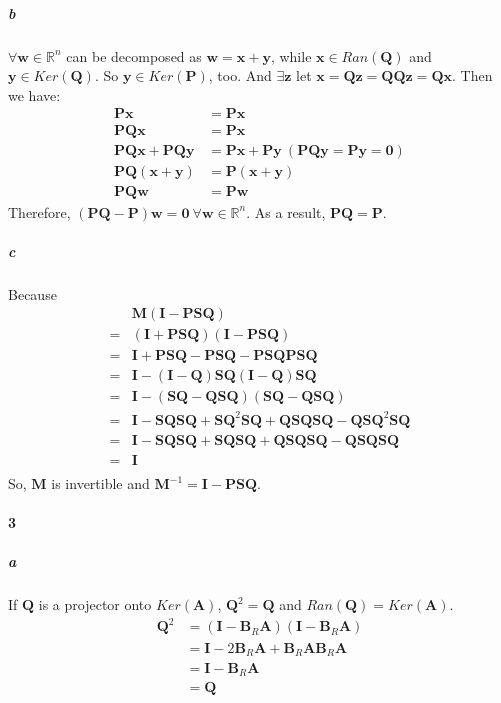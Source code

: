 \documentclass[22pt]{article}
\begin{document}
		\subparagraph{b}$\forall \mathbf{w} \in \mathbb{R}^{n}$ can be decomposed as $\mathbf{w} = \mathbf{x} + \mathbf{y}$, while $\mathbf{x} \in Ran(\mathbf{Q})$ and $\mathbf{y} \in Ker(\mathbf{Q})$. So $\mathbf{y} \in Ker(\mathbf{P})$, too. And $\exists \mathbf{z}$ let $\mathbf{x} = \mathbf{Qz} = \mathbf{QQz} = \mathbf{Qx}$. Then we have:
		\begin{align}
			\mathbf{Px} & = \mathbf{Px}\\
			\mathbf{PQx} & = \mathbf{Px} \\
			\mathbf{PQx} + \mathbf{PQy} & = \mathbf{Px} + \mathbf{Py} \ (\mathbf{PQy} = \mathbf{Py} = \mathbf{0})\\
			\mathbf{PQ(x+y)} & = \mathbf{P(x+y)}\\
			\mathbf{PQw} & = \mathbf{Pw}
		\end{align}
		Therefore, $(\mathbf{PQ}-\mathbf{P})\mathbf{w} = \mathbf{0}\  \forall \mathbf{w} \in \mathbb{R}^n$. As a result, $\mathbf{PQ} = \mathbf{P}$.


		\subparagraph{c}Because
		\begin{align}
		&\mathbf{M}(\mathbf{I}-\mathbf{PSQ})\\
		=&(\mathbf{I}+\mathbf{PSQ})(\mathbf{I}-\mathbf{PSQ})\\
		=&\mathbf{I} + \mathbf{PSQ} - \mathbf{PSQ} -\mathbf{PSQPSQ}\\
		=&\mathbf{I} - (\mathbf{I}-\mathbf{Q})\mathbf{SQ}(\mathbf{I}-\mathbf{Q})\mathbf{SQ}\\
		=&\mathbf{I} - (\mathbf{SQ} - \mathbf{QSQ})(\mathbf{SQ} - \mathbf{QSQ})\\
		=&\mathbf{I} - \mathbf{SQSQ} + \mathbf{SQ}^2\mathbf{SQ} +\mathbf{QSQSQ} - \mathbf{QSQ}^2\mathbf{SQ}\\
		=&\mathbf{I} - \mathbf{SQSQ} + \mathbf{SQSQ}+\mathbf{QSQSQ}- \mathbf{QSQSQ}\\
		=&\mathbf{I}\\
		\end{align}
		So, $\mathbf{M}$ is invertible and $\mathbf{M}^{-1}=\mathbf{I}-\mathbf{PSQ}$.

	\paragraph{3}
		\subparagraph{a} If $\mathbf{Q}$ is a projector onto $Ker(\mathbf{A})$, $\mathbf{Q}^2 = \mathbf{Q}$ and $Ran(\mathbf{Q}) = Ker(\mathbf{A})$.
		\begin{align}
			\mathbf{Q}^2 &= (\mathbf{I}-\mathbf{B}_R\mathbf{A})(\mathbf{I}-\mathbf{B}_R\mathbf{A})\\
			& = \mathbf{I} - 2\mathbf{B}_R\mathbf{A} + \mathbf{B}_R\mathbf{A}\mathbf{B}_R\mathbf{A}\\
			& = \mathbf{I} - \mathbf{B}_R\mathbf{A}\\
			& = \mathbf{Q}
		\end{align}
\end{document}
